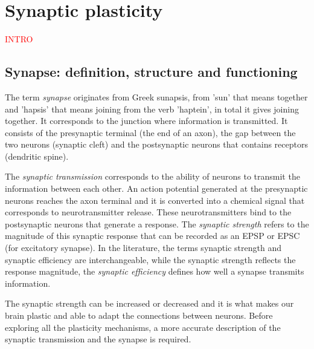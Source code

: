 \section{Synaptic plasticity}

\textcolor{red}{INTRO}

\subsection{Synapse: definition, structure and functioning}
The term \textit{synapse} originates from Greek sunapsis, from 'sun' that means together and 'hapsis' that means joining from the verb 'haptein', in total it gives joining together. It corresponds to the junction where information is transmitted. It consists of the presynaptic terminal (the end of an axon), the gap between the two neurons (synaptic cleft) and the postsynaptic neurons that contains receptors (dendritic spine). 


The \textit{synaptic transmission} corresponds to the ability of neurons to transmit the information between each other. An action potential generated at the presynaptic neurons reaches the axon terminal and it is converted into a chemical signal that corresponds to neurotransmitter release. These neurotransmitters bind to the postsynaptic neurons that generate a response. The \textit{synaptic strength} refers to the magnitude of this synaptic response that can be recorded as an \acrfull{EPSP} or \acrfull{EPSC} (for excitatory synapse).  In the literature, the terms synaptic strength and synaptic efficiency are interchangeable, while the synaptic strength reflects the response magnitude, the  \textit{synaptic efficiency} defines how well a synapse transmits information. 

The synaptic strength can be increased or decreased and it is what makes our brain plastic and able to adapt the connections between neurons. Before exploring all the plasticity mechanisms, a more accurate description of the synaptic transmission and the synapse is required.







